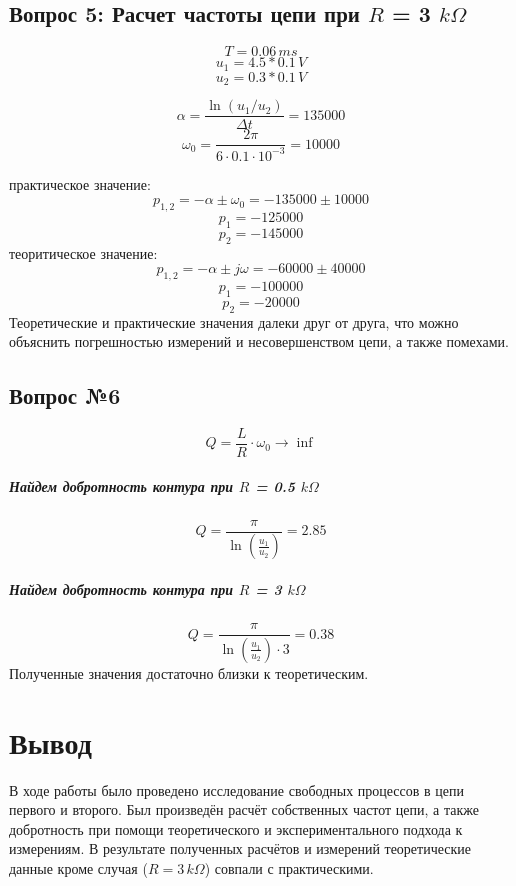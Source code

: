 \documentclass[a4paper,12pt]{report}
\begin{document}
\begin{flushleft}
  \subsection*{Вопрос 5: Расчет частоты цепи при $R$ = 3 $k\Omega$}
  \[ T =  0.06 \, ms \]
  \[ u_1 = 4.5 * 0.1 \, V \]
  \[ u_2 = 0.3 * 0.1 \, V \]

  \[ \alpha = \frac{\ln(u_1/u_2)}{\Delta t} = 135000\]
  \[ \omega_0 = \frac{2 \pi}{6\cdot 0.1\cdot 10^{-3}} = 10000 \]

  практическое значение:
  \[ p_{1,2} = -\alpha \pm \omega_0 = -135000 \pm 10000 \]
  \[p_1 = -125000\]
  \[ p_2 = -145000\]
  теоритическое значение:
  \[ p_{1,2} = -\alpha \pm j\omega = -60000 \pm 40000\]
  \[ p_1 = -100000 \]
  \[ p_2 = -20000 \]
  Теоретические и практические значения далеки друг от друга, что можно объяснить погрешностью измерений и несовершенством цепи, а также помехами.

  \subsection*{Вопрос №6 }

\[ Q = \frac{L}{R} \cdot \omega_0 \longrightarrow \inf \]

\subparagraph*{Найдем добротность контура при $R$ = 0.5 $k\Omega$}
\[ Q = \frac{\pi}{\ln(\frac{u_1}{u_2})} = 2.85 \]

\subparagraph*{Найдем добротность контура при $R$ = 3 $k\Omega$}
\[ Q = \frac{\pi}{\ln(\frac{u_1}{u_2})\cdot 3} = 0.38 \]
Полученные значения достаточно близки к теоретическим.



\end{flushleft}
\newpage

\section*{Вывод}
В ходе работы было проведено исследование свободных процессов в цепи первого и второго. Был произведён расчёт собственных частот цепи, а также добротность при помощи теоретического и экспериментального подхода к измерениям. В результате полученных расчётов и измерений теоретические данные кроме случая ($R = 3 \, k\Omega$) совпали с практическими.
\end{document}
